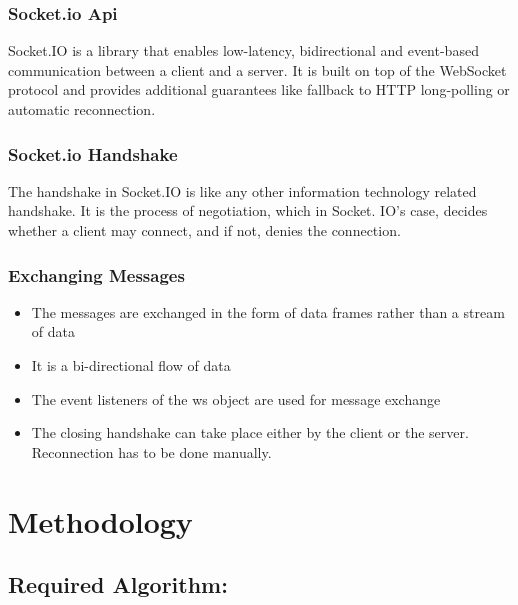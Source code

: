 \subsection{Socket.io Api}
Socket.IO is a library that enables low-latency, bidirectional and event-based communication between a client and a server. It is built on top of the WebSocket protocol and provides additional guarantees like fallback to HTTP long-polling or automatic reconnection.

\subsection{Socket.io Handshake}
The handshake in Socket.IO is like any other information technology related handshake. It is the process of negotiation, which in Socket. IO's case, decides whether a client may connect, and if not, denies the connection.

\subsection{Exchanging Messages}
\vspace{-18pt}
\begin{itemize}
	\item The messages are exchanged in the form of data frames rather than a stream of data
	\item It is a bi-directional flow of data
	\item The event listeners of the ws object are used for message exchange
	\item The closing handshake can take place either by the client or the server. Reconnection has to be done manually.
\end{itemize}

\chapter{Methodology}

\section{Required Algorithm:}

